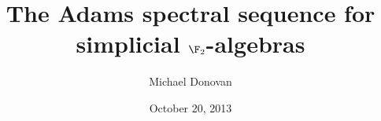 \documentclass{beamer}
\renewcommand{\calC}{\scrK}
\begin{document}
\title{The Adams spectral sequence for simplicial $\F_2$-algebras}   
\author{Michael Donovan} 
\date{October 20, 2013} 
\frame{\titlepage} 

%
%
%
%
%
\end{document}
